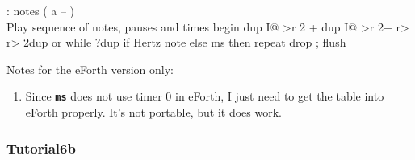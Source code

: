 \documentclass[10pt,english]{article}
\begin{document}
: notes ( a -- ) \\ Play sequence of notes, pauses and times
   begin  dup I@ >r  2 + dup I@ >r  2+
      r> r> 2dup or while  ?dup if
         Hertz note  else  ms
      then  repeat  drop ;
flush
\nwendcode{}\nwdocspar

Notes for the eForth version only:
\begin{enumerate}
\item Since \texttt{\textbf{ms}} does not use timer 0 in eForth, I just
need to get the table into eForth properly. It's not portable, but
it does work.
\end{enumerate}

\subsubsection{Tutorial6b}
\end{document}
